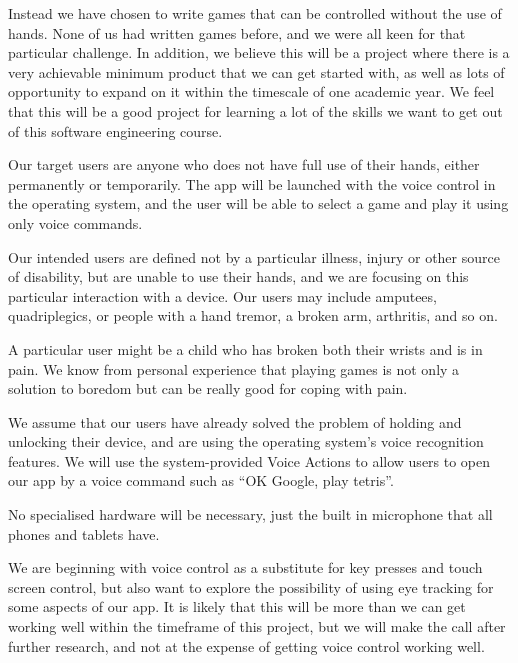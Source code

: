 \documentclass[11pt, oneside]{article}
\begin{document}
Instead we have chosen to write games that can be controlled without
the use of hands. None of us had written games before, and we were all
keen for that particular challenge. In addition, we believe this will
be a project where there is a very achievable minimum product that we
can get started with, as well as lots of opportunity to expand on it
within the timescale of one academic year. We feel that this will be a
good project for learning a lot of the skills we want to get out of
this software engineering course.

Our target users are anyone who does not have full use of their hands,
either permanently or temporarily. The app will be launched with the
voice control in the operating system, and the user will be able to
select a game and play it using only voice commands. 

Our intended users are defined not by a particular illness, injury or
other source of disability, but are unable to use their hands, and we
are focusing on this particular interaction with a device. Our users
may include amputees, quadriplegics, or people with a hand tremor, a
broken arm, arthritis, and so on.


A particular user might be a child who has broken both their wrists
and is in pain. We know from personal experience that playing games
is not only a solution to boredom but can be really good for coping
with pain.

We assume that our users have already solved the problem of holding
and unlocking their device, and are using the operating system's voice
recognition features. We will use the system-provided Voice Actions to
allow users to open our app by a voice command such as ``OK Google,
play tetris''.

No specialised hardware will be necessary, just the built in
microphone that all phones and tablets have.


We are beginning with voice control as a substitute for key presses
and touch screen control, but also want to explore the possibility of
using eye tracking for some aspects of our app. It is likely that this
will be more than we can get working well within the timeframe of this
project, but we will make the call after further research, and not at
the expense of getting voice control working well.
\end{document}
